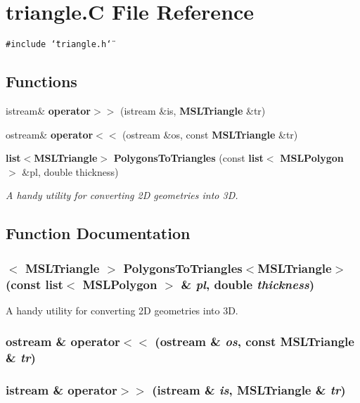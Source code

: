 \section{triangle.C File Reference}
\label{triangle_8C}
{\tt \#include \char`\"{}triangle.h\char`\"{}}\par
\subsection*{Functions}
\begin{CompactItemize}
\item 
istream\& {\bf operator$>$$>$} (istream \&is, {\bf MSLTriangle} \&tr)
\item 
ostream\& {\bf operator$<$$<$} (ostream \&os, const {\bf MSLTriangle} \&tr)
\item 
{\bf list}$<${\bf MSLTriangle}$>$ {\bf Polygons\-To\-Triangles} (const {\bf list}$<$ {\bf MSLPolygon} $>$ \&pl, double thickness)
\begin{CompactList}\small\item\em A handy utility for converting 2D geometries into 3D.\item\end{CompactList}\end{CompactItemize}


\subsection{Function Documentation}
\subsubsection{$<$ {\bf MSLTriangle} $>$ Polygons\-To\-Triangles$<${\bf MSLTriangle}$>$ (const {\bf list}$<$ {\bf MSLPolygon} $>$ \& {\em pl}, double {\em thickness})}\label{triangle_8C_a2}


A handy utility for converting 2D geometries into 3D.

\subsubsection{\setlength{\rightskip}{0pt plus 5cm}ostream \& operator$<$$<$ (ostream \& {\em os}, const {\bf MSLTriangle} \& {\em tr})}\label{triangle_8C_a1}


\subsubsection{\setlength{\rightskip}{0pt plus 5cm}istream \& operator$>$$>$ (istream \& {\em is}, {\bf MSLTriangle} \& {\em tr})}\label{triangle_8C_a0}


